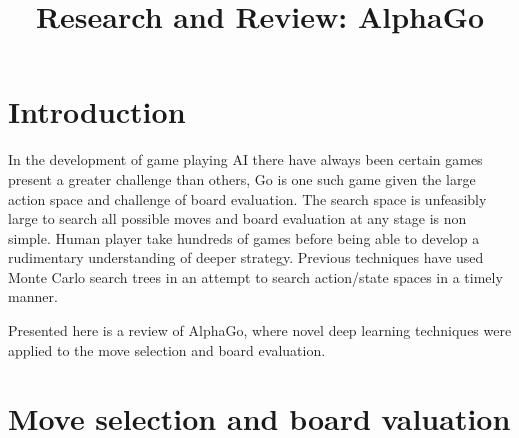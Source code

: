 \documentclass[11pt]{article}
\title{\textbf{Research and Review: AlphaGo}}
\begin{document}
\maketitle

\newpage

\section{Introduction}
 In the development of game playing AI there have always been certain games present a greater challenge than others, Go is one such game given the large action space and challenge of board evaluation\cite{allis1994searching}. The search space is unfeasibly large to search all possible moves and board evaluation at any stage is non simple. Human player take hundreds of games before being able to develop a rudimentary understanding of deeper strategy\cite{allis1994searching}. Previous techniques have used Monte Carlo search trees in an attempt to search action/state spaces in a timely manner\cite{mcts_remi}.

 Presented here is a review of AlphaGo\cite{alphago}, where novel deep learning techniques were applied to the move selection and board evaluation.

\section{Move selection and board valuation}
\end{document}
